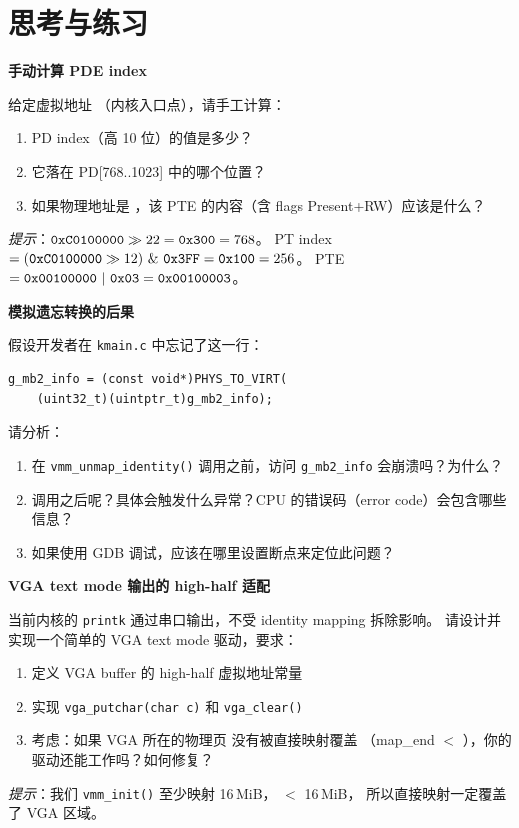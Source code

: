 \section{思考与练习}

\begin{exercise}
\textbf{手动计算 PDE index}

给定虚拟地址 （内核入口点），请手工计算：
\begin{enumerate}
  \item PD index（高 10 位）的值是多少？
  \item 它落在 PD[768..1023] 中的哪个位置？
  \item 如果物理地址是 ，该 PTE 的内容（含 flags Present+RW）应该是什么？
\end{enumerate}

\textit{提示}：$\texttt{0xC0100000} \gg 22 = \texttt{0x300} = 768$。
PT index $= (\texttt{0xC0100000} \gg 12)\ \&\ \texttt{0x3FF} = \texttt{0x100} = 256$。
PTE $= \texttt{0x00100000}\ |\ \texttt{0x03} = \texttt{0x00100003}$。
\end{exercise}

\begin{exercise}
\textbf{模拟遗忘转换的后果}

假设开发者在 \texttt{kmain.c} 中忘记了这一行：
\begin{lstlisting}[style=cstyle]
g_mb2_info = (const void*)PHYS_TO_VIRT(
    (uint32_t)(uintptr_t)g_mb2_info);
\end{lstlisting}

请分析：
\begin{enumerate}
  \item 在 \texttt{vmm\_unmap\_identity()} 调用之前，访问 \texttt{g\_mb2\_info} 会崩溃吗？为什么？
  \item 调用之后呢？具体会触发什么异常？CPU 的错误码（error code）会包含哪些信息？
  \item 如果使用 GDB 调试，应该在哪里设置断点来定位此问题？
\end{enumerate}
\end{exercise}

\begin{exercise}
\textbf{VGA text mode 输出的 high-half 适配}

当前内核的 \texttt{printk} 通过串口输出，不受 identity mapping 拆除影响。
请设计并实现一个简单的 VGA text mode 驱动，要求：
\begin{enumerate}
  \item 定义 VGA buffer 的 high-half 虚拟地址常量
  \item 实现 \texttt{vga\_putchar(char c)} 和 \texttt{vga\_clear()}
  \item 考虑：如果 VGA 所在的物理页  没有被直接映射覆盖
        （map\_end $<$ ），你的驱动还能工作吗？如何修复？
\end{enumerate}

\textit{提示}：我们 \texttt{vmm\_init()} 至少映射 16\,MiB， $<$ 16\,MiB，
所以直接映射一定覆盖了 VGA 区域。
\end{exercise}

